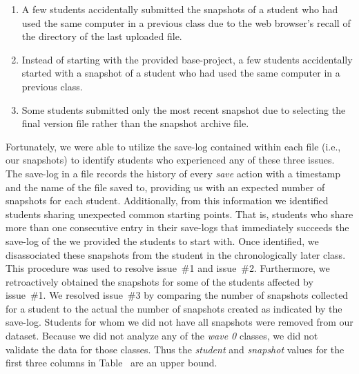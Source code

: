 \begin{enumerate}
\item A few students accidentally submitted the snapshots of a student who had
  used the same computer in a previous class due to the web browser's recall of
  the directory of the last uploaded file.
\item Instead of starting with the provided base-project, a few students
  accidentally started with a snapshot of a student who had used the same
  computer in a previous class.
\item Some students submitted only the most recent snapshot due to selecting
  the final version file rather than the snapshot archive file.
\end{enumerate}

Fortunately, we were able to utilize the save-log contained within each
\sprogram{} file (i.e., our snapshots) to identify students who experienced any
of these three issues. The save-log in a \sprogram{} file records the history
of every \emph{save} action with a timestamp and the name of the file saved to,
providing us with an expected number of snapshots for each
student. Additionally, from this information we identified students sharing
unexpected common starting points. That is, students who share more than one
consecutive entry in their  save-logs that immediately succeeds
the save-log of the \sprogram{} we provided the students to start with. Once
identified, we disassociated these snapshots from the student in the
chronologically later class. This procedure was used to resolve issue~\#1 and
issue~\#2. Furthermore, we retroactively obtained the snapshots for some of the
students affected by issue~\#1. We resolved issue~\#3 by comparing the number
of snapshots collected for a student to the actual the number of snapshots
created as indicated by the save-log. Students for whom we did not have all
snapshots were removed from our dataset. Because we did not analyze any of the
\emph{wave 0} classes, we did not validate the data for those classes. Thus the
\emph{student} and \emph{snapshot} values for the first three columns in
Table~ are an upper bound.
